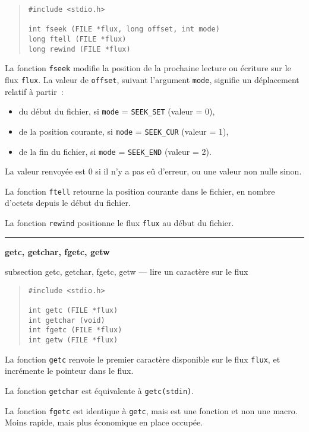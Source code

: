 \documentclass [twoside] {report}
\newcommand {\primitive} [1]
    {
	\phantomsection
	{\large \bf #1}
	\addcontentsline {toc} {subsection} {#1}
    }
\newcommand {\separation}
    {
	\vspace {5mm}
	\nopagebreak
	\hrule
    }
\begin{document}
\begin {quote}
\begin {verbatim}
#include <stdio.h>

int fseek (FILE *flux, long offset, int mode)
long ftell (FILE *flux)
long rewind (FILE *flux)
\end{verbatim}
\end {quote}

La fonction {\tt fseek} modifie la position de la prochaine
lecture ou écriture sur le flux {\tt flux}. La valeur de
{\tt offset}, suivant l'argument {\tt mode}, signifie un
déplacement relatif à partir~:

\begin {itemize}
\item du début du fichier, si {\tt mode} = {\tt SEEK\_SET} (valeur = 0),
\item de la position courante, si {\tt mode} = {\tt SEEK\_CUR} (valeur = 1),
\item de la fin du fichier, si {\tt mode} = {\tt SEEK\_END} (valeur = 2).
\end {itemize}

La valeur renvoyée est 0 si il n'y a pas eû d'erreur, ou une valeur
non nulle sinon.

La fonction {\tt ftell} retourne la position courante dans le
fichier, en nombre d'octets depuis le début du fichier.

La fonction {\tt rewind} positionne le flux {\tt flux} au début
du fichier.


\separation
\primitive {getc, getchar, fgetc, getw} --- lire un caractère sur le flux

\begin {quote}
\begin {verbatim}
#include <stdio.h>

int getc (FILE *flux)
int getchar (void)
int fgetc (FILE *flux)
int getw (FILE *flux)
\end{verbatim}
\end {quote}

La fonction {\tt getc} renvoie le premier caractère
disponible sur le flux {\tt flux}, et incrémente le pointeur
dans le flux.

La fonction {\tt getchar} est équivalente à {\tt getc(stdin)}.

La fonction {\tt fgetc} est identique à {\tt getc}, mais est une
fonction et non une macro. Moins rapide, mais plus
économique en place occupée.
\end{document}
